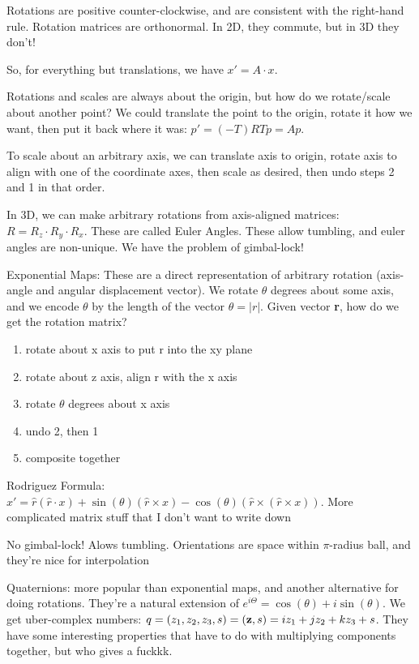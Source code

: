 \documentclass{article}
\begin{document}
Rotations are positive counter-clockwise, and are consistent with the right-hand rule. Rotation matrices are orthonormal. In 2D, they commute, but in 3D they don't!

So, for everything but translations, we have $x'=A\cdot x$.

Rotations and scales are always about the origin, but how do we rotate/scale about another point? We could translate the point to the origin, rotate it how we want, then put it back where it was: $p'=(-T)RTp=Ap$.

To scale about an arbitrary axis, we can translate axis to origin, rotate axis to align with one of the coordinate axes, then scale as desired, then undo steps 2 and 1 in that order.

In 3D, we can make arbitrary rotations from axis-aligned matrices: $R=R_z\cdot R_y\cdot R_x$. These are called Euler Angles. These allow tumbling, and euler angles are non-unique. We have the problem of gimbal-lock!

\vspace{10pt}
Exponential Maps: These are a direct representation of arbitrary rotation (axis-angle and angular displacement vector). We rotate $\theta$ degrees about some axis, and we encode $\theta$ by the length of the vector $\theta=|r|$. Given vector {\bf r}, how do we get the rotation matrix?

\begin{enumerate}
	\item rotate about x axis to put r into the xy plane
	\item rotate about z axis, align r with the x axis
	\item rotate $\theta$ degrees about x axis
	\item undo 2, then 1
	\item composite together
\end{enumerate}

Rodriguez Formula: $x'=\hat{r}(\hat{r}\cdot x)+\sin(\theta)(\hat{r}\times x)-\cos(\theta)(\hat{r}\times(\hat{r}\times x))$. More complicated matrix stuff that I don't want to write down

No gimbal-lock! Alows tumbling. Orientations are space within $\pi$-radius ball, and they're nice for interpolation

\vspace{10pt}
Quaternions: more popular than exponential maps, and another alternative for doing rotations. They're a natural extension of $e^{i\Theta}=\cos(\theta)+i\sin(\theta)$. We get uber-complex numbers: $q=(z_1,z_2,z_3,s)=({\bf z},s) = iz_1+jz_2+kz_3+s$. They have some interesting properties that have to do with multiplying components together, but who gives a fuckkk.
\end{document}
